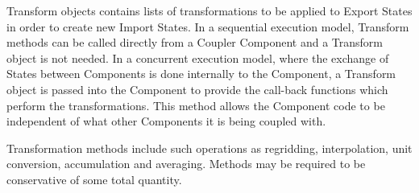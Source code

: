 %


Transform objects contains lists of transformations to be
applied to Export States in order to create new Import States.
In a sequential execution model, Transform methods can be called 
directly from a Coupler Component and a Transform object is
not needed.  
In a concurrent execution model, where
the exchange of States between Components is done internally to
the Component, a Transform object is passed into the Component
to provide the call-back functions which perform the transformations.
This method allows the Component code to be independent of
what other Components it is being coupled with.

Transformation methods include such operations as 
regridding, interpolation, unit conversion, accumulation and averaging.
Methods may be required to be conservative of some total quantity.



